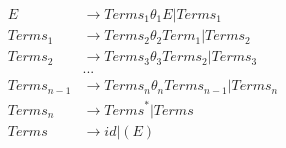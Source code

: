 \documentclass{article}
\begin{document}
\begin{enumerate}[a)]
\begin{equation}
        \begin{split}
             E &\xrightarrow{} {Terms}_{1} \theta_{1} E | {Terms}_{1} \\
             {Terms}_{1} &\xrightarrow{} {Terms}_{2} \theta_{2} {Term}_{1} | {Terms}_{2} \\
             {Terms}_{2} &\xrightarrow{} {Terms}_{3} \theta_{3} {Terms}_{2} | {Terms}_{3} \\
              &... \\
             {Terms}_{n-1} &\xrightarrow{} {Terms}_{n} \theta_{n} {Terms}_{n - 1} | Terms_{n} \\
             {Terms}_{n} &\xrightarrow{} {Terms}^{*} | Terms \\
             {Terms} &\xrightarrow{} id | (E)
        \end{split}
    \end{equation}
\end{enumerate}

\clearpage
\end{document}
